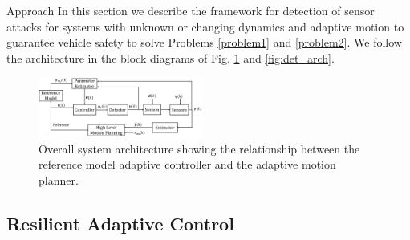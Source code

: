 
\begin{section}{Approach}
\label{sec:approach}
In this section we describe the framework for detection of sensor attacks for systems with unknown or changing dynamics and adaptive motion to guarantee vehicle safety to solve Problems \ref{problem1} and \ref{problem2}. We follow the architecture in the block diagrams of Fig. \ref{fig:system_arch} and \ref{fig:det_arch}. 







\begin{figure}[ht!]
\vspace{1pt}
\centering
\includegraphics[width=0.48\textwidth]{sys_arch.png}
\caption{Overall system architecture showing the relationship between the reference model adaptive controller and the adaptive motion planner.}
\label{fig:system_arch}
\end{figure}

\subsection{Resilient Adaptive Control}
\label{sec:Res_adapt_control}


\end{section}
